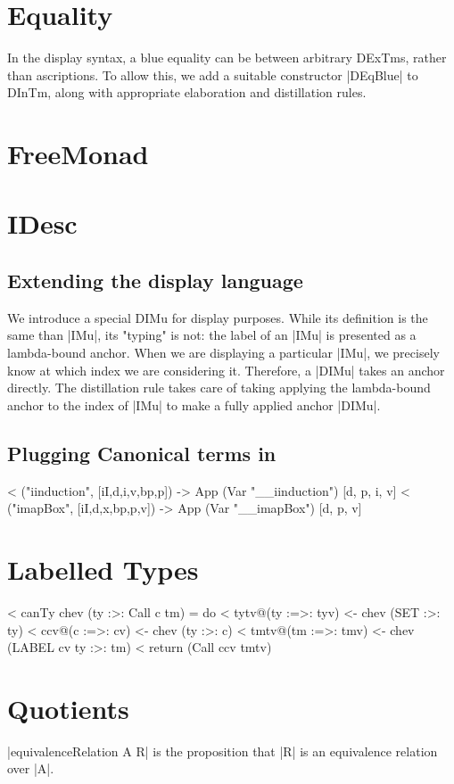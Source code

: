 \section{Equality}

In the display syntax, a blue equality can be between arbitrary DExTms,
rather than ascriptions. To allow this, we add a suitable constructor |DEqBlue|
to DInTm, along with appropriate elaboration and distillation rules.

\section{FreeMonad}


\section{IDesc}

\subsection{Extending the display language}

We introduce a special DIMu for display purposes. While its definition
is the same than |IMu|, its "typing" is not: the label of an |IMu| is
presented as a lambda-bound anchor. When we are displaying a
particular |IMu|, we precisely know at which index we are considering
it. Therefore, a |DIMu| takes an anchor directly. The distillation
rule takes care of taking applying the lambda-bound anchor to the
index of |IMu| to make a fully applied anchor |DIMu|.

\subsection{Plugging Canonical terms in}

<  ("iinduction", [iI,d,i,v,bp,p]) -> App (Var "__iinduction") [d, p, i, v]
<  ("imapBox", [iI,d,x,bp,p,v]) -> App (Var "__imapBox") [d, p, v]

\section{Labelled Types}


<   canTy chev (ty :>: Call c tm) = do
<      tytv@(ty :=>: tyv) <- chev (SET :>: ty)
<      ccv@(c :=>: cv) <- chev (ty :>: c)
<      tmtv@(tm :=>: tmv) <- chev (LABEL cv ty :>: tm)
<      return (Call ccv tmtv)

\section{Quotients}

|equivalenceRelation A R| is the proposition that |R| is an equivalence
relation over |A|.
